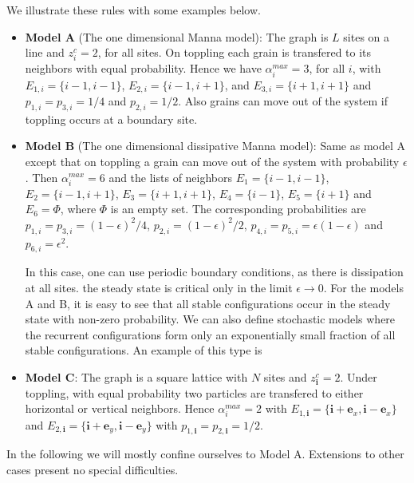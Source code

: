 \documentclass[11pt,a4paper]{book}
\begin{document}
We illustrate these rules with some examples below.
\begin{itemize}
\item
\textbf{Model A} (The one dimensional Manna model): The graph is $L$
sites on a line and $z_i^c= 2$, for all sites. On toppling each
grain is transfered to its neighbors with equal probability. Hence
we have $\alpha_i^{max}=3$, for all $i$, with $E_{1,i}=\{i-1, i-1\}$, 
$E_{2, i}=\{i-1,
i+1\}$, and $E_{3, i}=\{i+1, i+1\}$ and
$p_{1,i}=p_{3,i}=1/4$ and $p_{2,i}=1/2$. Also grains can move out of the
system  if  toppling occurs  at a boundary site.
\item
\textbf{Model B} (The one dimensional dissipative Manna model): Same
as model A except that on toppling a grain
can move out of the system with probability $\epsilon$. Then
$\alpha_i^{max}=6$ and the lists of neighbors $E_1=\{i-1,i-1\}$,
$E_2=\{i-1,i+1\}$, $E_3=\{i+1,i+1\}$, $E_4=\{i-1\}$, $E_5=\{i+1\}$ and
$E_6=\Phi$, where $\Phi$ is an empty set. The corresponding probabilities are
$p_{1,i}=p_{3,i}=(1-\epsilon)^2/4$, $p_{2,i}=(1-\epsilon)^2/2$,
$p_{4,i}=p_{5,i}=\epsilon(1-\epsilon)$ and $p_{6,i}=\epsilon^2$.

In this case, one can use periodic boundary conditions, as there is 
dissipation at all sites. the steady state is critical only in the limit 
$\epsilon \rightarrow 0$.
For the models A and B, it is easy to see that all stable configurations 
occur in the steady state with non-zero probability. We can also define 
stochastic models where the recurrent configurations form only an 
exponentially small fraction of all stable configurations. An example of 
this type is 

\item
\textbf{Model C}:
The graph is a square lattice with $N$ sites and
$z_{\mathbf{i}}^c=2$. Under
toppling, with equal probability two particles are transfered to
either horizontal or vertical neighbors.  Hence $\alpha_i^{max}=2$ with
$E_{1,\mathbf{i}}=\{\mathbf{i}+\mathbf{e}_x,\mathbf{i}-\mathbf{e}_x\}$
and $E_{2,\mathbf{i}}=\{\mathbf{i}+\mathbf{e}_y,\mathbf{i}-\mathbf{e}_y\}$ with
$p_{1,\mathbf{i}}=p_{2,\mathbf{i}}=1/2$.
\end{itemize}

In the following we will mostly confine ourselves to Model A.
Extensions to other cases present no special difficulties.
\end{document}
